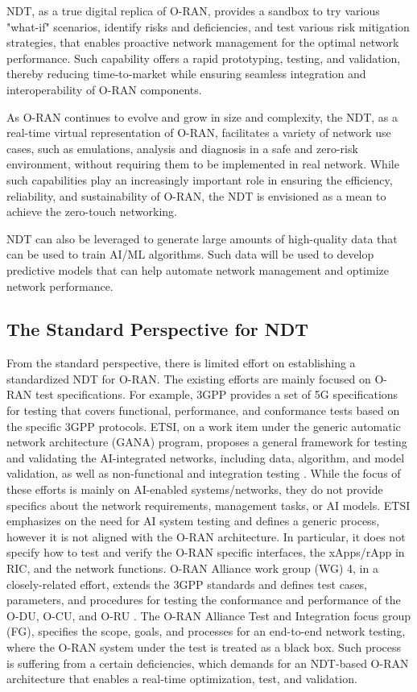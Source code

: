 \documentclass[]{IEEEtran}
\begin{document}
	
NDT, as a true digital replica of O-RAN,  provides a sandbox to try various "what-if" scenarios, identify risks and deficiencies, and test various risk mitigation strategies, that enables proactive network management for the optimal network performance. Such capability offers a rapid prototyping, testing, and validation, thereby reducing time-to-market while ensuring  seamless integration and interoperability of O-RAN components.
 
 As O-RAN continues to evolve and grow in size and complexity, the NDT, as a real-time virtual representation of O-RAN, facilitates a variety of network use cases, such as emulations, analysis and diagnosis in a safe and zero-risk environment, without requiring them to be implemented in real network. While such capabilities play an increasingly important role in ensuring the efficiency, reliability, and sustainability of O-RAN, the NDT is envisioned as a mean to achieve the zero-touch networking.
 
NDT can also be leveraged to generate large amounts of high-quality data that can be used to train AI/ML algorithms. Such data will be used to develop predictive models that can help automate network management and optimize network performance.  

\subsection{The Standard Perspective for NDT}
From the standard perspective, there is limited effort on establishing a standardized NDT for O-RAN. The existing efforts are mainly focused on O-RAN test specifications. For example, 3GPP provides a set of 5G specifications for testing that covers functional, performance, and conformance tests based on the specific 3GPP protocols. ETSI, on a work item under the generic automatic network architecture (GANA) program, proposes a general framework for testing and validating the AI-integrated networks, including data, algorithm, and model validation, as well as non-functional and integration testing \cite{ETSI_WP}. While the focus of these efforts is mainly on AI-enabled systems/networks, they do not provide specifics about the network requirements, management tasks, or AI models.  ETSI emphasizes on the need for AI system testing and defines a generic process, however it is not aligned with the O-RAN architecture. In particular, it does not specify how to test and verify the O-RAN specific interfaces, the xApps/rApp in RIC, and the network functions. O-RAN Alliance work group (WG) 4, in a closely-related effort, extends the 3GPP standards and defines test cases, parameters, and procedures for testing the conformance and performance of the O-DU, O-CU, and O-RU \cite{o-ran-E2E_tests}. The O-RAN Alliance Test and Integration focus group (FG), specifies the scope, goals, and processes for an end-to-end network testing, where the O-RAN system under the test is treated as a black box. Such process is suffering from a certain deficiencies, which demands for an NDT-based O-RAN architecture that enables a real-time optimization, test, and validation.
\end{document}
